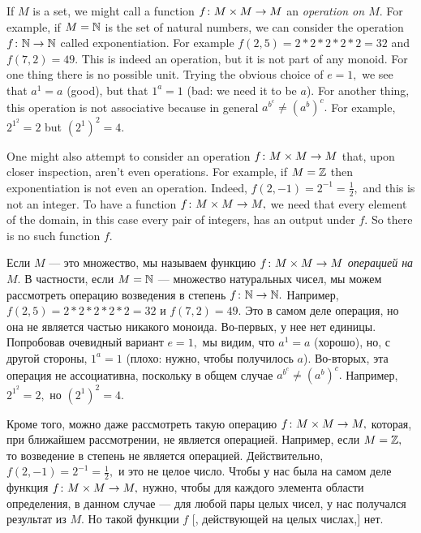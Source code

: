 \documentclass[CT4S-EN-RU]{subfiles}
\begin{document}
\begin{exampleENG}
If $M$ is a set, we might call a function $f\colon M\times M\rightarrow M$ an {\em operation on $M$}. For example, if $M={\mathbb N}$ is the set of natural numbers, we can consider the operation $f\colon{\mathbb N}\rightarrow{\mathbb N}$ called exponentiation. For example $f(2,5)=2*2*2*2*2=32$ and $f(7,2)=49.$ This is indeed an operation, but it is not part of any monoid. For one thing there is no possible unit. Trying the obvious choice of $e=1,$ we see that $a^1=a$ (good), but that $1^a=1$ (bad: we need it to be $a$). For another thing, this operation is not associative because in general $a^{b^c}\neq (a^b)^c.$ For example, $2^{1^2}=2$ but $(2^1)^2=4.$

One might also attempt to consider an operation $f\colon M\times M\rightarrow M$ that, upon closer inspection, aren't even operations. For example, if $M={\mathbb Z}$ then exponentiation is not even an operation. Indeed, $f(2,-1)=2^{-1}=\frac{1}{2},$ and this is not an integer. To have a function $f\colon M\times M\rightarrow M,$ we need that every element of the domain, in this case every pair of integers, has an output under $f.$ So there is no such function $f.$
\end{exampleENG}

\begin{exampleRUS}[Не моноид]
Если $M$ — это множество, мы называем функцию $f\colon M\times M\rightarrow M$ {\em операцией на $M$}. В частности, если $M={\mathbb N}$ — множество натуральных чисел, мы можем рассмотреть операцию возведения в степень $f\colon{\mathbb N}\rightarrow{\mathbb N}.$ Например, $f(2,5)=2*2*2*2*2=32$ и $f(7,2)=49.$ Это в самом деле операция, но она не является частью никакого моноида. Во-первых, у нее нет единицы. Попробовав очевидный вариант $e=1,$ мы видим, что $a^1=a$ (хорошо), но, с другой стороны, $1^a=1$ (плохо: нужно, чтобы получилось $a$). Во-вторых, эта операция не ассоциативна, поскольку в общем случае $a^{b^c}\neq (a^b)^c.$ Например, $2^{1^2}=2,$ но $(2^1)^2=4.$

Кроме того, можно даже рассмотреть такую операцию $f\colon M\times M\rightarrow M,$ которая, при ближайшем рассмотрении, не является операцией. Например, если $M={\mathbb Z},$ то возведение в степень не является операцией. Действительно, $f(2,-1)=2^{-1}=\frac{1}{2},$ и это не целое число. Чтобы у нас была на самом деле функция $f\colon M\times M\rightarrow M,$ нужно, чтобы для каждого элемента области определения, в данном случае — для любой пары целых чисел, у нас получался результат из $M.$ Но такой функции $f$ [, действующей на целых числах,] нет.
\end{exampleRUS}
\end{document}
